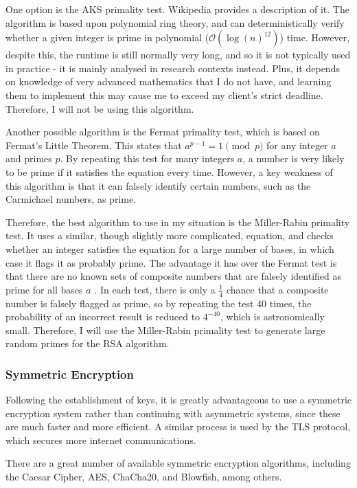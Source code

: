 \documentclass[../main.tex]{subfiles}
\begin{document}
One option is the AKS primality test. Wikipedia \cite{AKSWiki} provides a description of it. The algorithm is based upon polynomial ring theory, and can deterministically verify whether a given integer is prime in polynomial ($\mathcal{O}(\log(n)^{12})$) time. However, despite this, the runtime is still normally very long, and so it is not typically used in practice - it is mainly analysed in research contexts instead. Plus, it depends on knowledge of very advanced mathematics that I do not have, and learning them to implement this may cause me to exceed my client's strict deadline. Therefore, I will not be using this algorithm.

Another possible algorithm is the Fermat primality test, which is based on Fermat's Little Theorem. This states that $a^{p-1} = 1 \pmod p$ for any integer $a$ and primes $p$. By repeating this test for many integers $a$, a number is very likely to be prime if it satisfies the equation every time. However, a key weakness of this algorithm is that it can falsely identify certain numbers, such as the Carmichael numbers, as prime.

Therefore, the best algorithm to use in my situation is the Miller-Rabin primality test. It uses a similar, though slightly more complicated, equation, and checks whether an integer satisfies the equation for a large number of bases, in which case it flags it as probably prime. The advantage it has over the Fermat test is that there are no known sets of composite numbers that are falsely identified as prime for all bases $a$ \cite{MillerRabinWiki}. In each test, there is only a $\frac{1}{4}$ chance that a composite number is falsely flagged as prime, so by repeating the test 40 times, the probability of an incorrect result is reduced to $4^{-40}$, which is astronomically small. Therefore, I will use the Miller-Rabin primality test to generate large random primes for the RSA algorithm.

\subsubsection{Symmetric Encryption}

Following the establishment of keys, it is greatly advantageous to use a symmetric encryption system rather than continuing with asymmetric systems, since these are much faster and more efficient. A similar process is used by the TLS protocol, which secures more internet communications. 

There are a great number of available symmetric encryption algorithms, including the Caesar Cipher, AES, ChaCha20, and Blowfish, among others.
\end{document}

